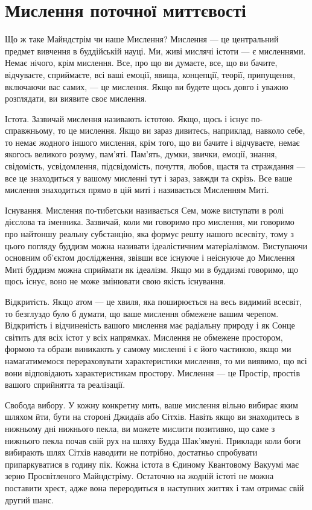 \section{Мислення поточної миттєвості}

Що ж таке Майндстрім чи наше Мислення? Мислення --- це центральний предмет
вивчення в  буддійській науці. Ми, живі мислячі істоти --- є мисленнями. Немає нічого,
крім мислення. Все, про що ви думаєте, все, що ви бачите, відчуваєте, сприймаєте,
всі ваші емоції, явища, концепції, теорії, припущення, включаючи вас самих, --- це мислення.
Якщо ви будете щось довго і уважно розглядати, ви виявите своє мислення.

Істота. Зазвичай мислення називають істотою. Якщо, щось і існує по-справжньому, то це мислення.
Якщо ви зараз дивитесь, наприклад, навколо себе, то немає жодного іншого мислення,
крім того, що ви бачите і відчуваєте, немає якогось великого розуму, пам'яті.
Пам'ять, думки, звички, емоції, знання, свідомість, усвідомлення, підсвідомість, почуття,
любов, щастя та страждання --- все це знаходиться у вашому мисленні тут і зараз, завжди та скрізь.
Все ваше мислення знаходиться прямо в цій миті і називається Мисленням Миті.

Існування. Мислення по-тибетськи називається Сем, може виступати в ролі дієслова
та іменника. Зазвичай, коли ми говоримо про мислення, ми говоримо про найтоншу
реальну субстанцію, яка формує решту нашого всесвіту, тому з цього погляду буддизм
можна називати ідеалістичним матеріалізмом. Виступаючи основним об'єктом дослідження,
звівши все існуюче і неіснуюче до Мислення Миті буддизм можна сприймати як ідеалізм.
Якщо ми в буддизмі говоримо, що щось існує, воно не може змінювати свою якість існування.

Відкритість. Якщо атом --- це хвиля, яка поширюється на весь видимий всесвіт,
то безглуздо було б думати, що ваше мислення обмежене вашим черепом. Відкритість і відчиненість
вашого мислення має радіальну природу і як Сонце світить для всіх істот у всіх напрямках.
Мислення не обмежене простором, формою та образи виникають у самому мисленні і є його частиною,
якщо ми намагатимемося перераховувати характеристики мислення, то ми виявимо, що всі вони
відповідають характеристикам простору. Мислення --- це Простір, простів вашого сприйнятта та реалізації.

Свобода вибору. У кожну конкретну мить, ваше мислення вільно вибирає яким шляхом йти,
бути на стороні Джидаїв або Сітхів. Навіть якщо ви знаходитесь в нижньому дні
нижнього пекла, ви можете мислити позитивно, що саме з нижнього пекла почав свій рух
на шляху Будда Шак'ямуні. Приклади коли боги вибирають шлях Сітхів наводити не потрібно,
достатньо спробувати припаркуватися в годину пік. Кожна істота в Єдиному Квантовому
Вакуумі має зерно Просвітленого Майндстріму. Остаточно на жодній істоті не можна поставити хрест,
адже вона переродиться в наступних життях і там отримає свій другий шанс.

